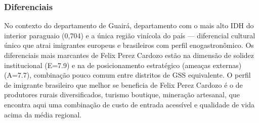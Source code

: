 \subsubsection*{Diferenciais}\label{dif-felix-perez-cardozo-0405}
No contexto do departamento de Guairá, departamento com o mais alto IDH do interior paraguaio (0,704) e a única região vinícola do país — diferencial cultural único que atrai imigrantes europeus e brasileiros com perfil enogastronômico. Os diferenciais mais marcantes de Felix Perez Cardozo estão na dimensão de solidez institucional (E=7.9) e na de posicionamento estratégico (ameaças externas) (A=7.7), combinação pouco comum entre distritos de GSS equivalente. O perfil de imigrante brasileiro que melhor se beneficia de Felix Perez Cardozo é o de produtores rurais diversificados, turismo boutique, mineração artesanal, que encontra aqui uma combinação de custo de entrada acessível e qualidade de vida acima da média regional.
